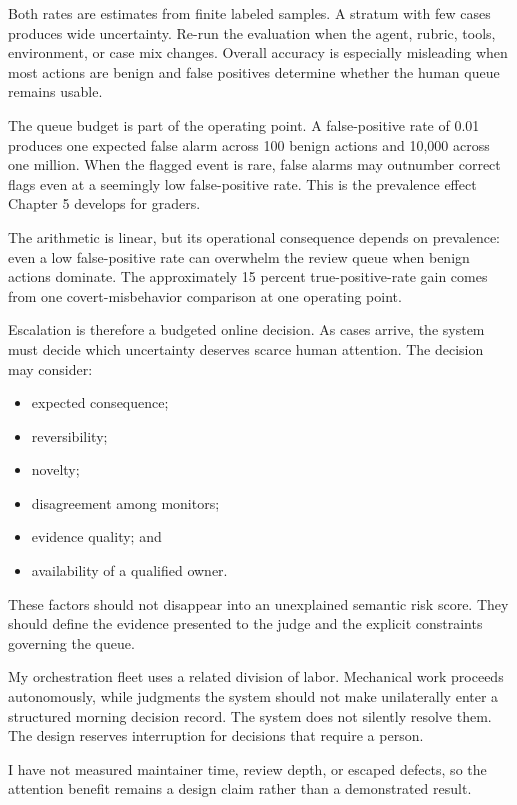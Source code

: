 Both rates are estimates from finite labeled samples. A stratum with few cases produces wide uncertainty. Re-run the evaluation when the agent, rubric, tools, environment, or case mix changes. Overall accuracy is especially misleading when most actions are benign and false positives determine whether the human queue remains usable.

The queue budget is part of the operating point. A false-positive rate of 0.01 produces one expected false alarm across 100 benign actions and 10,000 across one million. When the flagged event is rare, false alarms may outnumber correct flags even at a seemingly low false-positive rate. This is the prevalence effect Chapter 5 develops for graders.

The arithmetic is linear, but its operational consequence depends on prevalence: even a low false-positive rate can overwhelm the review queue when benign actions dominate. The approximately 15 percent true-positive-rate gain comes from one covert-misbehavior comparison at one operating point.


Escalation is therefore a budgeted online decision. As cases arrive, the system must decide which uncertainty deserves scarce human attention. The decision may consider:

\begin{itemize}
\tightlist
\item
  expected consequence;
\item
  reversibility;
\item
  novelty;
\item
  disagreement among monitors;
\item
  evidence quality; and
\item
  availability of a qualified owner.
\end{itemize}

These factors should not disappear into an unexplained semantic risk score. They should define the evidence presented to the judge and the explicit constraints governing the queue.

My orchestration fleet uses a related division of labor. Mechanical work proceeds autonomously, while judgments the system should not make unilaterally enter a structured morning decision record. The system does not silently resolve them. The design reserves interruption for decisions that require a person.

I have not measured maintainer time, review depth, or escaped defects, so the attention benefit remains a design claim rather than a demonstrated result.

